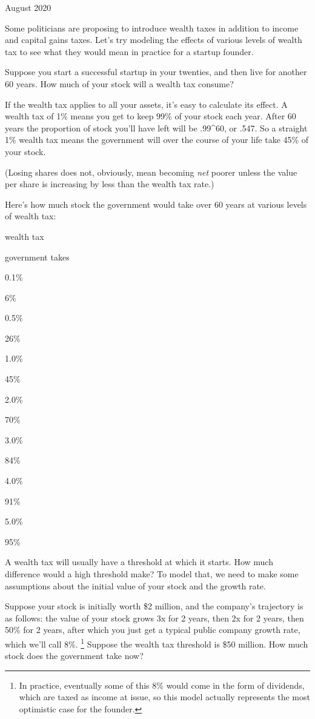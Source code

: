 \documentclass[12pt]{book}
\begin{document}
August 2020

Some politicians are proposing to introduce wealth taxes in addition to
income and capital gains taxes. Let's try modeling the effects of
various levels of wealth tax to see what they would mean in practice for
a startup founder.

Suppose you start a successful startup in your twenties, and then live
for another 60 years. How much of your stock will a wealth tax consume?

If the wealth tax applies to all your assets, it's easy to calculate its
effect. A wealth tax of 1\% means you get to keep 99\% of your stock
each year. After 60 years the proportion of stock you'll have left will
be .99\^{}60, or .547. So a straight 1\% wealth tax means the government
will over the course of your life take 45\% of your stock.

(Losing shares does not, obviously, mean becoming \emph{net} poorer
unless the value per share is increasing by less than the wealth tax
rate.)

Here's how much stock the government would take over 60 years at various
levels of wealth tax:

wealth tax

government takes

0.1\%

6\%

0.5\%

26\%

1.0\%

45\%

2.0\%

70\%

3.0\%

84\%

4.0\%

91\%

5.0\%

95\%

A wealth tax will usually have a threshold at which it starts. How much
difference would a high threshold make? To model that, we need to make
some assumptions about the initial value of your stock and the growth
rate.

Suppose your stock is initially worth \$2 million, and the company's
trajectory is as follows: the value of your stock grows 3x for 2 years,
then 2x for 2 years, then 50\% for 2 years, after which you just get a
typical public company growth rate, which we'll call 8\%.
\footnote{In practice, eventually some of this 8\% would come in the form
of dividends, which are taxed as income at issue, so this model actually
represents the most optimistic case for the founder.} Suppose the wealth tax threshold is \$50
million. How much stock does the government take now?
\end{document}
